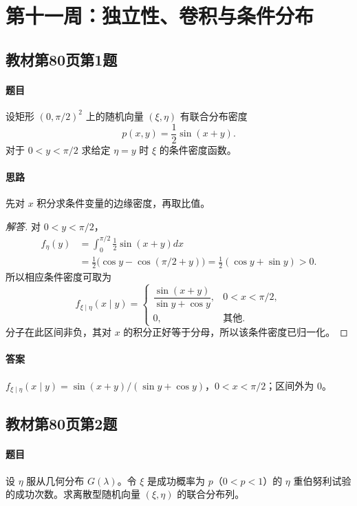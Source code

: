 \section{第十一周：独立性、卷积与条件分布}

\subsection{教材第80页第1题}\label{ex:w11-b80-1}
\paragraph{题目}
设矩形 $(0,\pi/2)^2$ 上的随机向量 $(\xi,\eta)$ 有联合分布密度
\[
p(x,y)=\frac12\sin(x+y).
\]
对于 $0<y<\pi/2$ 求给定 $\eta=y$ 时 $\xi$ 的条件密度函数。
\paragraph{思路}先对 $x$ 积分求条件变量的边缘密度，再取比值。
\begin{proof}[解答]
对 $0<y<\pi/2$，
\begin{align*}
f_\eta(y)&=\int_0^{\pi/2}\frac12\sin(x+y)dx\\
&=\frac12\bigl(\cos y-\cos(\pi/2+y)\bigr)
=\frac12(\cos y+\sin y)>0.
\end{align*}
所以相应条件密度可取为
\[
f_{\xi\mid\eta}(x\mid y)=
\begin{cases}\dfrac{\sin(x+y)}{\sin y+\cos y},&0<x<\pi/2,\\0,&\text{其他}.\end{cases}
\]
分子在此区间非负，其对 $x$ 的积分正好等于分母，所以该条件密度已归一化。
\end{proof}
\paragraph{答案}$f_{\xi\mid\eta}(x\mid y)=\sin(x+y)/(\sin y+\cos y)$，$0<x<\pi/2$；区间外为 $0$。

\subsection{教材第80页第2题}\label{ex:w11-b80-2}
\paragraph{题目}
设 $\eta$ 服从几何分布 $G(\lambda)$。令 $\xi$ 是成功概率为 $p$（$0<p<1$）的 $\eta$ 重伯努利试验的成功次数。求离散型随机向量 $(\xi,\eta)$ 的联合分布列。

